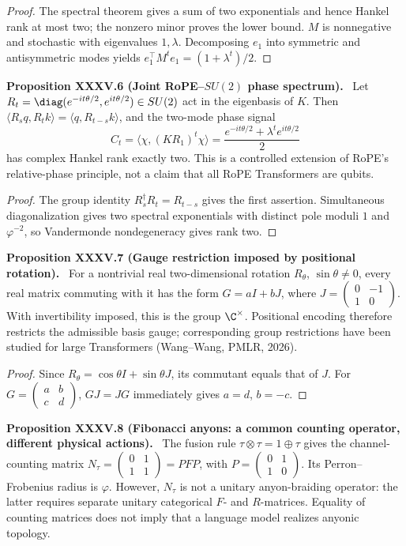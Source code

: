 \documentclass[11pt,a4paper,oneside]{book}
\newcommand{\statement}[3]{\par\medskip\noindent\textbf{#1 #2 (#3).}\ }
\begin{document}
\begin{proof}
The spectral theorem gives a sum of two exponentials and hence Hankel rank at most two; the nonzero minor proves the lower bound. $M$ is nonnegative and stochastic with eigenvalues $1,\lambda$. Decomposing $e_1$ into symmetric and antisymmetric modes yields $e_1^\top M^te_1=(1+\lambda^t)/2$.
\end{proof}
\statement{Proposition}{XXXV.6}{Joint RoPE--$SU(2)$ phase spectrum}
Let $R_t=\diag(e^{-it\theta/2},e^{it\theta/2})\in SU(2)$ act in the eigenbasis of $K$. Then $\langle R_sq,R_tk\rangle=\langle q,R_{t-s}k\rangle$, and the two-mode phase signal
\begin{equation}C_t=\langle\chi,(KR_1)^t\chi\rangle=\frac{e^{-it\theta/2}+\lambda^te^{it\theta/2}}2\tag{125}\end{equation}
has complex Hankel rank exactly two. This is a controlled extension of RoPE's relative-phase principle, not a claim that all RoPE Transformers are qubits.
\begin{proof}
The group identity $R_s^\dagger R_t=R_{t-s}$ gives the first assertion. Simultaneous diagonalization gives two spectral exponentials with distinct pole moduli $1$ and $\varphi^{-2}$, so Vandermonde nondegeneracy gives rank two.
\end{proof}
\statement{Proposition}{XXXV.7}{Gauge restriction imposed by positional rotation}
For a nontrivial real two-dimensional rotation $R_\theta$, $\sin\theta\ne0$, every real matrix commuting with it has the form $G=aI+bJ$, where $J=\left(\begin{smallmatrix}0&-1\\1&0\end{smallmatrix}\right)$. With invertibility imposed, this is the group $\C^\times$. Positional encoding therefore restricts the admissible basis gauge; corresponding group restrictions have been studied for large Transformers (Wang--Wang, PMLR, 2026).
\begin{proof}
Since $R_\theta=\cos\theta I+\sin\theta J$, its commutant equals that of $J$. For $G=\left(\begin{smallmatrix}a&b\\c&d\end{smallmatrix}\right)$, $GJ=JG$ immediately gives $a=d$, $b=-c$.
\end{proof}
\statement{Proposition}{XXXV.8}{Fibonacci anyons: a common counting operator, different physical actions}
The fusion rule $\tau\otimes\tau=1\oplus\tau$ gives the channel-counting matrix $N_\tau=\left(\begin{smallmatrix}0&1\\1&1\end{smallmatrix}\right)=PFP$, with $P=\left(\begin{smallmatrix}0&1\\1&0\end{smallmatrix}\right)$. Its Perron--Frobenius radius is $\varphi$. However, $N_\tau$ is not a unitary anyon-braiding operator: the latter requires separate unitary categorical $F$- and $R$-matrices. Equality of counting matrices does not imply that a language model realizes anyonic topology.
\end{document}
